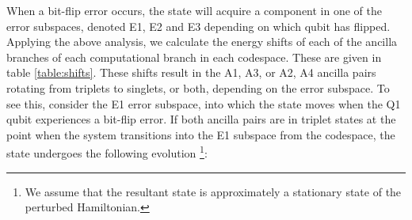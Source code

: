 \documentclass{report}
\begin{document}
\begin{appendices}
When a bit-flip error occurs, the state will acquire a component in one of the error subspaces, denoted E1, E2 and E3 depending on which qubit has flipped. Applying the above analysis, we calculate the energy shifts of each of the ancilla branches of each computational branch in each codespace. These are given in table \ref{table:shifts}. These shifts result in the A1, A3, or A2, A4 ancilla pairs rotating from triplets to singlets, or both, depending on the error subspace. To see this, consider the E1 error subspace, into which the state moves when the Q1 qubit experiences a bit-flip error. If both ancilla pairs are in triplet states at the point when the system transitions into the E1 subspace from the codespace, the state undergoes the following evolution \footnote{We assume that the resultant state is approximately a stationary state of the perturbed Hamiltonian.}:


\end{appendices}
\end{document}

